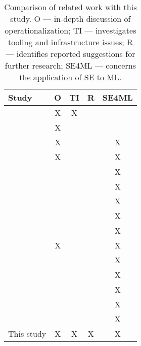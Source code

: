 \begin{table}[h]
    \centering
    \begin{tabular}{l c c c c}
        Study & O & TI & R & SE4ML \\
        \hline
        \textcite{Shahin2017} & X & X & & \\
        \textcite{Rodriguez2017} & X & & & \\
        \textcite{Baier2019} & X & & & X \\
        \textcite{Paleyes2020} & X & & & X \\
        \textcite{Kumeno2020} & & & & X \\
        \textcite{Nascimento2020} & & & & X \\
        \textcite{Lwakatare2020} & & & & X \\
        \textcite{Lwakatare2020a} & & & & X \\
        \textcite{Serban2020} & & & & X \\
        \textcite{John2021} & X & & & X \\
        \textcite{Giray2021} & & & & X \\
        \textcite{Lorenzoni2021} & & & & X \\
        \textcite{MartinezFernandez2021} & & & & X \\
        \textcite{Serban2021} & & & & X \\
        \textcite{John2021a} & & & & X \\
        This study & X & X & X & X \\
    \end{tabular}
    \caption{Comparison of related work with this study. O --- in-depth discussion of operationalization; TI --- investigates tooling and infrastructure issues; R --- identifies reported suggestions for further research; SE4ML --- concerns the application of SE to ML.}
    \label{tab:related_work_comparison}
\end{table}